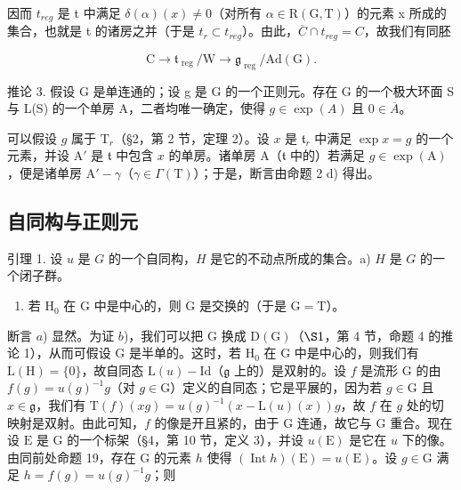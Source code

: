 因而 \(t_{reg}\) 是 t 中满足 \(\delta(\alpha)(x) \neq 0\)（对所有 \(\alpha \in \mathrm{R}(\mathrm{G}, \mathrm{T})\)）的元素 x 所成的集合，也就是 t 的诸房之并（于是 \(t_r \subset t_{reg}\)）。由此，\(\overline{C} \cap t_{reg} = C\)，故我们有同胚

\[
\mathrm{C} \rightarrow \mathfrak {t} _ {\text { reg }} / \mathrm{W} \rightarrow \mathfrak {g} _ {\text { reg }} / \mathrm{Ad} (\mathrm{G}).
\]

推论 3. 假设 G 是单连通的；设 g 是 G 的一个正则元。存在 G 的一个极大环面 S 与 L(S) 的一个单房 A，二者均唯一确定，使得 \(g \in \exp(A)\) 且 \(0 \in \overline{A}\)。

可以假设 \(g\) 属于 \(\mathrm{T}_r\)（§2，第 2 节，定理 2）。设 \(x\) 是 \(\mathfrak{t}_r\) 中满足 \(\exp x = g\) 的一个元素，并设 \(\mathrm{A}'\) 是 \(\mathfrak{t}\) 中包含 \(x\) 的单房。诸单房 \(\mathrm{A}\)（\(\mathfrak{t}\) 中的）若满足 \(g \in \exp(\mathrm{A})\)，便是诸单房 \(\mathrm{A}' - \gamma\)（\(\gamma \in \Gamma(\mathrm{T})\)）；于是，断言由命题 2 d) 得出。

\subsection{自同构与正则元}

引理 1. 设 \(u\) 是 \(G\) 的一个自同构，\(H\) 是它的不动点所成的集合。a) \(H\) 是 \(G\) 的一个闭子群。

\begin{enumerate}
\def\labelenumi{\alph{enumi})}
\setcounter{enumi}{1}
\tightlist
\item
  若 \(\mathrm{H}_0\) 在 G 中是中心的，则 G 是交换的（于是 \(\mathrm{G} = \mathrm{T}\)）。
\end{enumerate}

断言 \(a\)) 显然。为证 \(b\))，我们可以把 \(\mathrm{G}\) 换成 \(\mathrm{D}(\mathrm{G})\)（\(\S 1\)，第 4 节，命题 4 的推论 1），从而可假设 \(\mathrm{G}\) 是半单的。这时，若 \(\mathrm{H}_0\) 在 \(\mathrm{G}\) 中是中心的，则我们有 \(\mathrm{L}(\mathrm{H}) = \{0\}\)，故自同态 \(\mathrm{L}(u) - \mathrm{Id}\)（\(\mathfrak{g}\) 上的）是双射的。设 \(f\) 是流形 \(\mathrm{G}\) 的由 \(f(g) = u(g)^{-1}g\)（对 \(g \in \mathrm{G}\)）定义的自同态；它是平展的，因为若 \(g \in \mathrm{G}\) 且 \(x \in \mathfrak{g}\)，我们有 \(\mathrm{T}(f)(xg) = u(g)^{-1}(x - \mathrm{L}(u)(x))g\)，故 \(f\) 在 \(g\) 处的切映射是双射。由此可知，\(f\) 的像是开且紧的，由于 \(\mathrm{G}\) 连通，故它与 \(\mathrm{G}\) 重合。现在设 \(\mathrm{E}\) 是 G 的一个标架（§4，第 10 节，定义 3），并设 \(u(\mathrm{E})\) 是它在 \(u\) 下的像。由同前处命题 19，存在 G 的元素 \(h\) 使得 \((\operatorname{Int} h)(\mathrm{E}) = u(\mathrm{E})\)。设 \(g \in \mathrm{G}\) 满足 \(h = f(g) = u(g)^{-1}g\)；则

